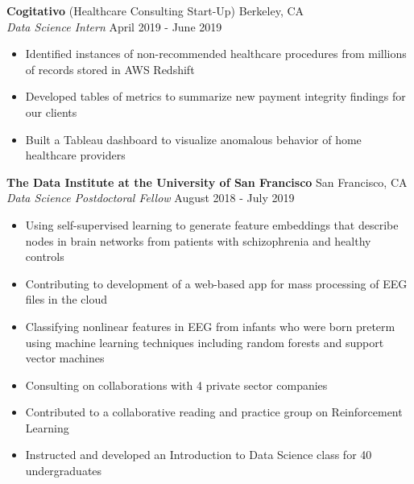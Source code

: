 \documentclass[line,margin,10pt]{res}
\begin{document}
\begin{resume}
\textbf{Cogitativo} (Healthcare Consulting Start-Up) \hfill Berkeley, CA \\
{\sl Data Science Intern} \hfill April 2019 - June 2019
\begin{itemize} \itemsep -2pt
\item Identified instances of non-recommended healthcare procedures from millions of records stored in AWS Redshift
\item Developed tables of metrics to summarize new payment integrity findings for our clients
\item Built a Tableau dashboard to visualize anomalous behavior of home healthcare providers
\end{itemize}

\textbf{The Data Institute at the University of San Francisco} \hfill San Francisco, CA \\
{\sl Data Science Postdoctoral Fellow} \hfill August 2018 - July 2019
\begin{itemize} \itemsep -2pt
\item Using self-supervised learning to generate feature embeddings that describe nodes in brain networks from patients with schizophrenia and healthy controls
\item Contributing to development of a web-based app for mass processing of EEG files in the cloud
\item Classifying nonlinear features in EEG from infants who were born preterm using machine learning techniques including random forests and support vector machines
\item Consulting on collaborations with 4 private sector companies
\item Contributed to a collaborative reading and practice group on Reinforcement Learning
\item Instructed and developed an Introduction to Data Science class for 40 undergraduates
\end{itemize}



\end{resume}
\end{document}
